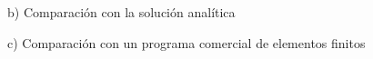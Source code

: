 \begin{desarrollo}{b) Comparaci\'on con la soluci\'on anal\'itica}

\end{desarrollo}

\begin{desarrollo}{c) Comparaci\'on con un programa comercial de elementos finitos}

\end{desarrollo}
